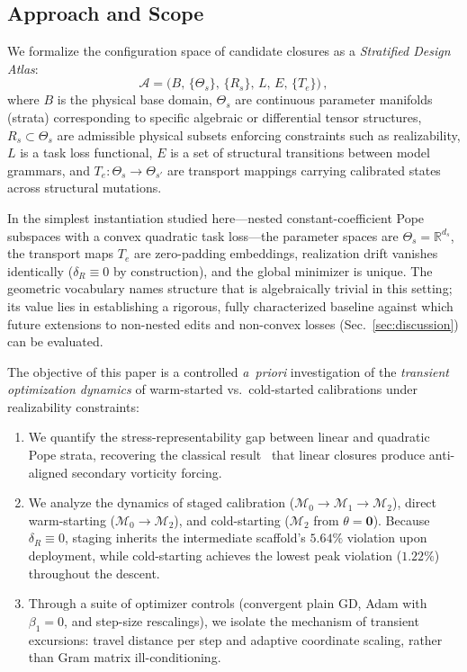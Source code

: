 \documentclass[preprint,aps,prb,longbibliography,superscriptaddress]{revtex4-2}
\newcommand{\dR}{\delta_R}
\begin{document}
\subsection{Approach and Scope}\label{sec:scope}

We formalize the configuration space of candidate closures as a
\emph{Stratified Design Atlas}:
\begin{equation}\label{eq:atlas}
  \mathcal{A} = \bigl(B,\, \{\Theta_s\},\, \{R_s\},\, L,\, E,\, \{T_e\}\bigr)\,,
\end{equation}
where $B$ is the physical base domain, $\Theta_s$ are continuous parameter
manifolds (strata) corresponding to specific algebraic or differential tensor
structures, $R_s \subset \Theta_s$ are admissible physical subsets enforcing
constraints such as realizability, $L$ is a task loss functional, $E$ is a
set of structural transitions between model grammars, and
$T_e: \Theta_s \to \Theta_{s'}$ are transport mappings carrying calibrated
states across structural mutations.

In the simplest instantiation studied here---nested constant-coefficient Pope
subspaces with a convex quadratic task loss---the parameter spaces are
$\Theta_s = \mathbb{R}^{d_s}$, the transport maps $T_e$ are zero-padding
embeddings, realization drift vanishes identically ($\dR \equiv 0$ by
construction), and the global minimizer is unique. The geometric vocabulary
names structure that is algebraically trivial in this setting; its value lies
in establishing a rigorous, fully characterized baseline against which future
extensions to non-nested edits and non-convex losses (Sec.~\ref{sec:discussion})
can be evaluated.

The objective of this paper is a controlled \emph{a~priori} investigation of
the \emph{transient optimization dynamics} of warm-started vs.\ cold-started
calibrations under realizability constraints:
\begin{enumerate}
  \item We quantify the stress-representability gap between linear and
    quadratic Pope strata, recovering the classical result~\cite{Speziale1987}
    that linear closures produce anti-aligned secondary vorticity forcing.
  \item We analyze the dynamics of staged calibration ($\mathcal{M}_0 \to
    \mathcal{M}_1 \to \mathcal{M}_2$), direct warm-starting ($\mathcal{M}_0 \to
    \mathcal{M}_2$), and cold-starting ($\mathcal{M}_2$ from $\theta = \mathbf{0}$).
    Because $\delta_R \equiv 0$, staging inherits the intermediate scaffold's
    $5.64\%$ violation upon deployment, while cold-starting achieves the lowest
    peak violation ($1.22\%$) throughout the descent.
  \item Through a suite of optimizer controls (convergent plain GD, Adam with
    $\beta_1 = 0$, and step-size rescalings), we isolate the mechanism of
    transient excursions: travel distance per step and adaptive coordinate
    scaling, rather than Gram matrix ill-conditioning.
\end{enumerate}
\end{document}
